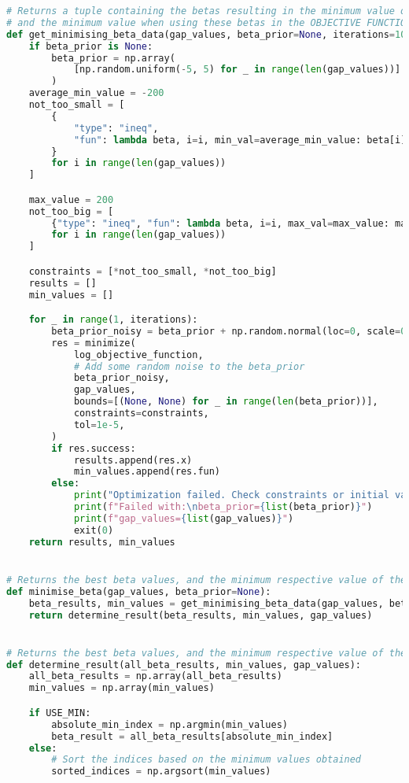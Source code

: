 {\begin{lstlisting}[language=Python]
# Returns a tuple containing the betas resulting in the minimum value of the LOG OBJECTIVE FUNCTION
# and the minimum value when using these betas in the OBJECTIVE FUNCTION.
def get_minimising_beta_data(gap_values, beta_prior=None, iterations=10):
    if beta_prior is None:
        beta_prior = np.array(
            [np.random.uniform(-5, 5) for _ in range(len(gap_values))]
        )
    average_min_value = -200
    not_too_small = [
        {
            "type": "ineq",
            "fun": lambda beta, i=i, min_val=average_min_value: beta[i] - min_val,
        }
        for i in range(len(gap_values))
    ]

    max_value = 200
    not_too_big = [
        {"type": "ineq", "fun": lambda beta, i=i, max_val=max_value: max_val - beta[i]}
        for i in range(len(gap_values))
    ]

    constraints = [*not_too_small, *not_too_big]
    results = []
    min_values = []

    for _ in range(1, iterations):
        beta_prior_noisy = beta_prior + np.random.normal(loc=0, scale=0.5, size=len(beta_prior))
        res = minimize(
            log_objective_function,
            # Add some random noise to the beta_prior
            beta_prior_noisy,
            gap_values,
            bounds=[(None, None) for _ in range(len(beta_prior))],
            constraints=constraints,
            tol=1e-5,
        )
        if res.success:
            results.append(res.x)
            min_values.append(res.fun)
        else:
            print("Optimization failed. Check constraints or initial values.")
            print(f"Failed with:\nbeta_prior={list(beta_prior)}")
            print(f"gap_values={list(gap_values)}")
            exit(0)
    return results, min_values


# Returns the best beta values, and the minimum respective value of the OBJECTIVE FUNCTION
def minimise_beta(gap_values, beta_prior=None):
    beta_results, min_values = get_minimising_beta_data(gap_values, beta_prior=beta_prior)
    return determine_result(beta_results, min_values, gap_values)


# Returns the best beta values, and the minimum respective value of the OBJECTIVE FUNCTION
def determine_result(all_beta_results, min_values, gap_values):
    all_beta_results = np.array(all_beta_results)
    min_values = np.array(min_values)

    if USE_MIN:
        absolute_min_index = np.argmin(min_values)
        beta_result = all_beta_results[absolute_min_index]
    else:
        # Sort the indices based on the minimum values obtained
        sorted_indices = np.argsort(min_values)


\end{lstlisting}}

